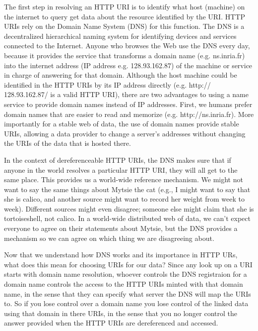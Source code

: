 The first step in resolving an HTTP URI is to identify what host (machine) on the internet 
to query get data about the resource identified by the URI. HTTP URIs rely on the Domain Name System (DNS) for this function.
The DNS is a decentralized hierarchical naming system for identifying
devices and services connected to the
Internet. Anyone who browses the Web use the DNS every day, because it provides the service that
transforms a domain name (e.g. ns.inria.fr)
into the internet address (IP address e.g. 128.93.162.87) of the machine
or service in charge of answering for that domain.  Although the host
machine could be identified in the HTTP URIs by its IP address directly
(e.g. http:// 128.93.162.87/ is a valid HTTP URI), there are two advantages to 
using a name service to provide domain names instead of IP addresses.  First, we humans prefer
domain names that are easier to read and memorize (e.g.
http://ns.inria.fr).   More importantly for a stable web of data, the use of domain names 
provide stable URIs, allowing a data provider to change a server's
addresses without changing the URIs of the data that is hosted there.


In the context of dereferenceable HTTP URIs, the DNS
makes sure that if anyone in the world resolves a particular HTTP URI, they
will all get to the same place.   This provides us a world-wide reference mechanism.  We 
might not want to say the same things about Mytsie the cat 
(e.g., I might want to say that she 
is calico, and another source might want to record her weight from week to week).  
Different sources might even disagree; someone else might claim that she is tortoiseshell, 
not calico.  In a world-wide distributed web of data, we can't expect everyone to agree on 
their statements
about Mytsie, but the DNS provides a mechanism so we can agree on which thing we are 
disagreeing about.

Now that we understand how DNS works and its importance in HTTP URs, what does this mean
for choosing URIs for our data? Since any look up on a URI starts with  domain name 
resolution, whoever controls the DNS registraion for a
domain name controls the access to the HTTP URIs minted with that domain
name, in the sense that they can specify what server the DNS will map the URIs to. 
So if you lose control over a domain name you lose control of the
linked data using that domain in there URIs, in the sense that you no
longer control the answer provided when the HTTP URIs are dereferenced
and accessed.

